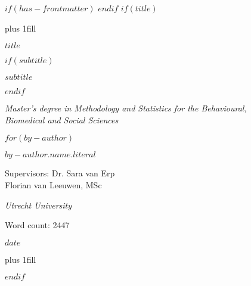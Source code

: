 $if(has-frontmatter)$
\frontmatter
$endif$
$if(title)$
\cleardoublepage
\thispagestyle{empty}
{\centering
\hbox{}\vskip 0cm plus 1fill
{\Large\bfseries $title$ \par}
$if(subtitle)$
\vspace{3ex}
{\large $subtitle$ \par}
$endif$
\vspace{3ex}
{\normalsize \textit{Master's degree in Methodology and Statistics for the Behavioural, \\ Biomedical and Social Sciences} \par}
\vspace{9ex}
$for(by-author)$
{\large\bfseries $by-author.name.literal$ \par}
\vspace{9ex}
{\large Supervisors: Dr. Sara van Erp \\
Florian van Leeuwen, MSc \par}
\vspace{9ex}
{\normalsize \textit{Utrecht University} \par}
\vspace{9ex}
{\normalsize Word count: 2447 \par}
\vspace{3ex}
{\normalsize $date$ \par}
\hbox{}\vskip 0cm plus 1fill
}
$endif$
